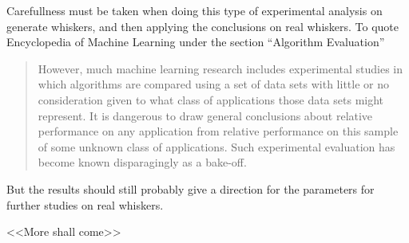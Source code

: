 
Carefullness must be taken when doing this type of experimental analysis on generate whiskers, and then
applying the conclusions on real whiskers. 
To quote Encyclopedia of Machine Learning\cite{EncyclopediaMachineLearning} under the section ``Algorithm Evaluation''
\begin{quote}
    However, much machine learning
    research includes experimental studies in which algorithms 
    are compared using a set of data sets with little
    or no consideration given to what class of applications
    those data sets might represent. It is dangerous to draw
    general conclusions about relative performance on any
    application from relative performance on this sample
    of some unknown class of applications. Such experimental
    evaluation has become known disparagingly as a bake-off.
\end{quote}

But the results should still probably give a direction for the parameters for further studies on real whiskers.

<<More shall come>>




